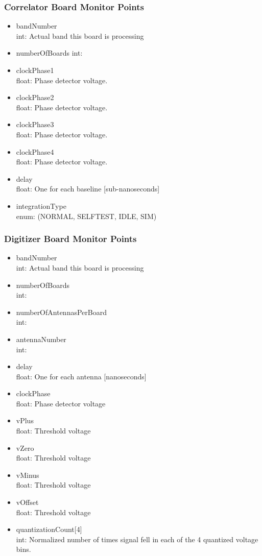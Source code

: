 \documentclass[11pt]{article}
\begin{document}
\subsubsection{Correlator Board Monitor Points}
\begin{itemize}
\item bandNumber \\
      int: Actual band this board is processing
\item numberOfBoards
      int:
\item clockPhase1 \\
      float: Phase detector voltage.
\item clockPhase2 \\
      float: Phase detector voltage.
\item clockPhase3 \\
      float: Phase detector voltage.
\item clockPhase4 \\
      float: Phase detector voltage.
\item delay \\
      float: One for each baseline [sub-nanoseconds]
\item integrationType \\
      enum: (NORMAL, SELFTEST, IDLE, SIM)
\end{itemize}

\subsubsection{Digitizer Board Monitor Points}
\begin{itemize}
\item bandNumber \\
      int: Actual band this board is processing
\item numberOfBoards \\
      int:
\item numberOfAntennasPerBoard \\
      int:
\item antennaNumber \\
      int:
\item delay \\
      float: One for each antenna [nanoseconds]
\item clockPhase \\
      float: Phase detector voltage
\item vPlus \\
      float: Threshold voltage
\item vZero \\
      float: Threshold voltage
\item vMinus \\
      float: Threshold voltage
\item vOffset \\
      float: Threshold voltage
\item quantizationCount[4] \\
      int: Normalized number of times signal fell in each of the 4 quantized
           voltage bins.
\end{itemize}
\end{document}
